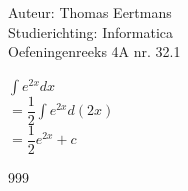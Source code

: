 \documentclass[a4paper]{article}
\begin{document}
  
\noindent \large Auteur: Thomas Eertmans \\
\noindent \large Studierichting: Informatica\\
\noindent \large Oefeningenreeks 4A nr. 32.1\\

\medskip

\normalsize

$\displaystyle\int e^{2x} dx$ \\

$= \dfrac{1}{2} \displaystyle\int e^{2x} d(2x)$ \\

$= \dfrac{1}{2} e^{2x} + c$

\begin{thebibliography}{999}
\end{thebibliography}
\end{document}
